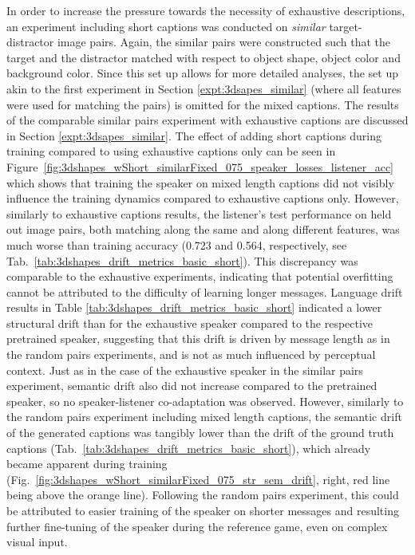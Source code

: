In order to increase the pressure towards the necessity of exhaustive descriptions, an experiment including short captions was conducted on \emph{similar} target-distractor image pairs. Again, the similar pairs were constructed such that the target and the distractor matched with respect to object shape, object color and background color. Since this set up allows for more detailed analyses, the set up akin to the first experiment in Section \ref{expt:3dsapes_similar} (where all features were used for matching the pairs) is omitted for the mixed captions. The results of the comparable similar pairs experiment with exhaustive captions are discussed in Section \ref{expt:3dsapes_similar}. The effect of adding short captions during training compared to using exhaustive captions only can be seen in Figure~\ref{fig:3dshapes_wShort_similarFixed_075_speaker_losses_listener_acc} which shows that training the speaker on mixed length captions did not visibly influence the training dynamics compared to exhaustive captions only. However, similarly to exhaustive captions results, the listener's test performance on held out image pairs, both matching along the same and along different features, was much worse than training accuracy (0.723 and 0.564, respectively, see Tab.~\ref{tab:3dshapes_drift_metrics_basic_short}). This discrepancy was comparable to the exhaustive experiments, indicating that potential overfitting cannot be attributed to the difficulty of learning longer messages. Language drift results in Table \ref{tab:3dshapes_drift_metrics_basic_short} indicated a lower structural drift than for the exhaustive speaker compared to the respective pretrained speaker, suggesting that this drift is driven by message length as in the random pairs experiments, and is not as much influenced by perceptual context. Just as in the case of the exhaustive speaker in the similar pairs experiment, semantic drift also did not increase compared to the pretrained speaker, so no speaker-listener co-adaptation was observed. However, similarly to the random pairs experiment including mixed length captions, the semantic drift of the generated captions was tangibly lower than the drift of the ground truth captions (Tab.~\ref{tab:3dshapes_drift_metrics_basic_short}), which already became apparent during training (Fig.~\ref{fig:3dshapes_wShort_similarFixed_075_str_sem_drift}, right, red line being above the orange line). Following the random pairs experiment, this could be attributed to easier training of the speaker on shorter messages and resulting further fine-tuning of the speaker during the reference game, even on complex visual input. 

